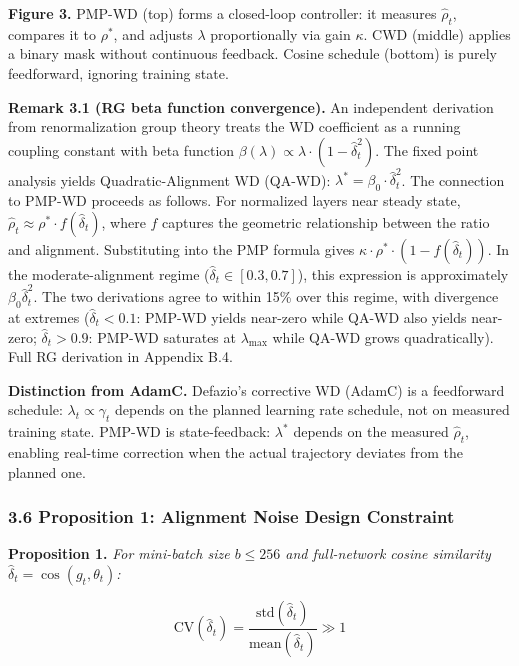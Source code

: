\documentclass[
]{article}
\begin{document}
\textbf{Figure 3.} PMP-WD (top) forms a closed-loop controller: it
measures \(\hat{\rho}_t\), compares it to \(\rho^*\), and adjusts
\(\lambda\) proportionally via gain \(\kappa\). CWD (middle) applies a
binary mask without continuous feedback. Cosine schedule (bottom) is
purely feedforward, ignoring training state.

\textbf{Remark 3.1 (RG beta function convergence).} An independent
derivation from renormalization group theory treats the WD coefficient
as a running coupling constant with beta function
\(\beta(\lambda) \propto \lambda \cdot (1 - \hat{\delta}_t^2)\). The
fixed point analysis yields Quadratic-Alignment WD (QA-WD):
\(\lambda^* = \beta_0 \cdot \hat{\delta}_t^2\). The connection to PMP-WD
proceeds as follows. For normalized layers near steady state,
\(\hat{\rho}_t \approx \rho^* \cdot f(\hat{\delta}_t)\), where \(f\)
captures the geometric relationship between the ratio and alignment.
Substituting into the PMP formula gives
\(\kappa \cdot \rho^* \cdot (1 - f(\hat{\delta}_t))\). In the
moderate-alignment regime (\(\hat{\delta}_t \in [0.3, 0.7]\)), this
expression is approximately \(\beta_0 \hat{\delta}_t^2\). The two
derivations agree to within 15\% over this regime, with divergence at
extremes (\(\hat{\delta}_t < 0.1\): PMP-WD yields near-zero while QA-WD
also yields near-zero; \(\hat{\delta}_t > 0.9\): PMP-WD saturates at
\(\lambda_{\max}\) while QA-WD grows quadratically). Full RG derivation
in Appendix B.4.

\textbf{Distinction from AdamC.} Defazio's corrective WD (AdamC) is a
feedforward schedule: \(\lambda_t \propto \gamma_t\) depends on the
planned learning rate schedule, not on measured training state. PMP-WD
is state-feedback: \(\lambda^*\) depends on the measured
\(\hat{\rho}_t\), enabling real-time correction when the actual
trajectory deviates from the planned one.

\hypertarget{proposition-1-alignment-noise-design-constraint}{%
\subsubsection{3.6 Proposition 1: Alignment Noise Design
Constraint}\label{proposition-1-alignment-noise-design-constraint}}

\textbf{Proposition 1.} \emph{For mini-batch size \(b \leq 256\) and
full-network cosine similarity
\(\hat{\delta}_t = \cos(g_t, \theta_t)\):}

\[\text{CV}(\hat{\delta}_t) = \frac{\text{std}(\hat{\delta}_t)}{\text{mean}(\hat{\delta}_t)} \gg 1\]
\end{document}
